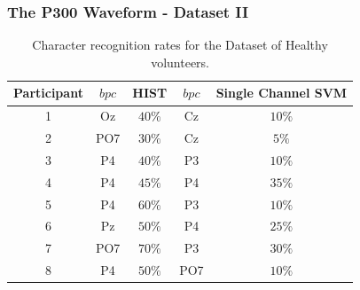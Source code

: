 \documentclass[aspectratio=169]{beamer}
\begin{document}
\begin{frame}
\frametitle{The P300 Waveform - Dataset II}
\begin{center}
\begin{table}[h!]
\caption{Character recognition rates for the Dataset of Healthy volunteers.}
\centering
\begin{tabular}{c|cc|cc}
\toprule
\textbf{Participant}	&  $bpc$	&  HIST &  $bpc$	&  Single Channel SVM \\
\midrule
1     &     Oz   &   $40\%$  &  Cz   &  $10\%$    \\
2     &     PO7   &   $30\%$      &  Cz   & $5\%$   \\
3     &     P4   &   $40\%$    &  P3   & $10\%$    \\
4     &     P4 &   $45\%$    &  P4   & $35\%$     \\
5     &     P4 &   $60\%$  &  P3   & $10\%$     \\
6     &     Pz &   $50\%$ &  P4   & $25\%$     \\
7     &     PO7 &   $70\%$  &  P3   & $30\%$     \\
8     &     P4 &   $50\%$    &  PO7   & $10\%$    \\

\end{tabular}
\label{tab:resultsown}
\end{table}
\end{center}
\end{frame} 
\end{document}
